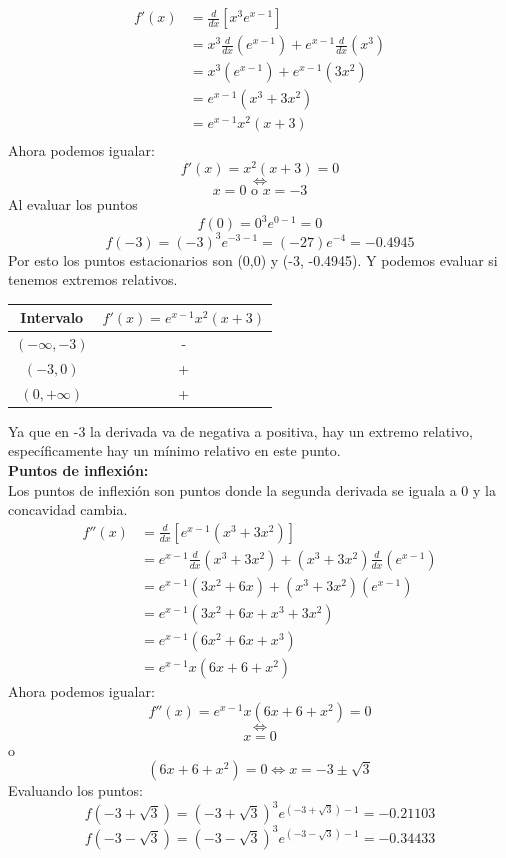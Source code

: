 \documentclass[12pt]{article}
\begin{document}
\begin{align*}
  f'(x)
  &= \frac{d}{dx} \left[x^3e^{x-1} \right]\\
  &= x^{3} \frac{d}{dx} (e^{x-1}) + e^{x-1}  \frac{d}{dx} (x^3)\\
  &= x^{3} (e^{x-1}) + e^{x-1}(3x^2)\\
  &= e^{x-1} ( x^{3}  + 3x^2 )\\
  &= e^{x-1} x^2(x+3)  \\
\end{align*}
Ahora podemos igualar:
\[
f'(x) = x^2(x+3) = 0  
\]
\[
\iff
\]
\[
x= 0 \text{ o } x = -3
\]
Al evaluar los puntos
\[
f(0)=0^3e^{0-1} = 0
\]
\[
f(-3)=(-3)^3e^{-3-1} = (-27)e^{-4} = -0.4945
\]
Por esto los puntos estacionarios son (0,0) y (-3, -0.4945). Y podemos evaluar si tenemos extremos relativos.
 \begin{table}[H]
    \centering
    \begin{tabular}{c|c}
      \hline
      Intervalo & $f'(x) = e^{x-1} x^2(x+3)   $  \\
      \hline
      $(-\infty,-3)$ & -  \\
      $(-3,0)$ & +  \\
      $(0,+\infty)$ & + \\
      \hline
    \end{tabular}
 \end{table}
 Ya que en -3 la derivada va de negativa a positiva, hay un extremo relativo, específicamente hay un mínimo relativo en este punto. \\
\textbf{Puntos de inflexión:}\\
 Los puntos de inflexión son puntos donde la segunda derivada se iguala a 0 y la concavidad cambia.
\begin{align*}
  f''(x)
  &= \frac{d}{dx} \left[ e^{x-1} ( x^{3}  + 3x^2 )   \right]\\
  &=  e^{x-1} \frac{d}{dx}( x^{3}  + 3x^2 ) +  ( x^{3}  + 3x^2 ) \frac{d}{dx} (e^{x-1}) \\
  &=  e^{x-1} ( 3x^{2}+ 6x ) +  ( x^{3}  + 3x^2 ) (e^{x-1}) \\
  &=  e^{x-1} ( 3x^{2}+ 6x  +   x^{3}  + 3x^2 ) \\
  &=  e^{x-1} ( 6x^{2}+ 6x  +   x^{3} )\\
  &=  e^{x-1} x ( 6x+ 6  +   x^{2} ) 
\end{align*}
Ahora podemos igualar:
\[
f''(x) = e^{x-1} x ( 6x+ 6  +   x^{2} )  = 0 
\]
\[
\iff
\]
\[
 x  = 0
 \]
 o
 \[
( 6x+ 6  +   x^{2} )  = 0  \iff x = -3 \pm \sqrt{3}
 \]
 Evaluando los puntos:
 \[
f(-3+ \sqrt{3}) = (-3 + \sqrt{3})^3e^{(-3 + \sqrt{3})-1} = -0.21103
\]
 \[
f(-3 - \sqrt{3}) = (-3 - \sqrt{3})^3e^{(-3 - \sqrt{3})-1} = -0.34433
 \]
\end{document}
